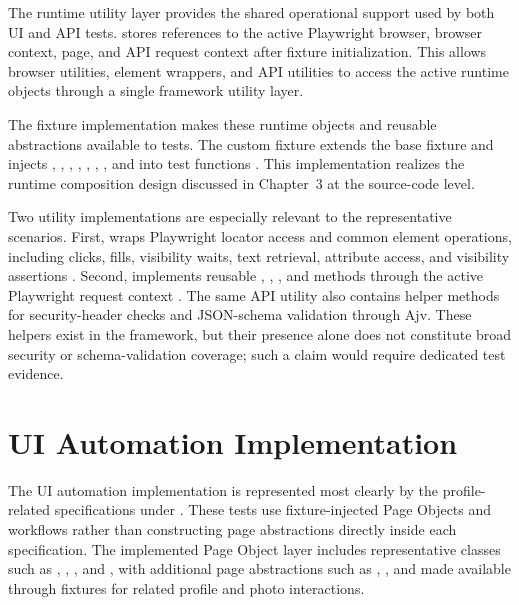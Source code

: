 The runtime utility layer provides the shared operational support used by both UI and API tests.  stores references to the active Playwright browser, browser context, page, and API request context after fixture initialization. This allows browser utilities, element wrappers, and API utilities to access the active runtime objects through a single framework utility layer.

The fixture implementation makes these runtime objects and reusable abstractions available to tests. The custom fixture extends the base fixture and injects , , , , , , , and  into test functions \autocite{playwright_docs_fixtures_2026}. This implementation realizes the runtime composition design discussed in Chapter~3 at the source-code level.

Two utility implementations are especially relevant to the representative scenarios. First,  wraps Playwright locator access and common element operations, including clicks, fills, visibility waits, text retrieval, attribute access, and visibility assertions \autocite{playwright_docs_locators_2026}. Second,  implements reusable , , , and  methods through the active Playwright request context \autocite{playwright_docs_apirequestcontext_2026}. The same API utility also contains helper methods for security-header checks and JSON-schema validation through Ajv. These helpers exist in the framework, but their presence alone does not constitute broad security or schema-validation coverage; such a claim would require dedicated test evidence.

\section{UI Automation Implementation}
\label{sec:ch4-ui-automation-implementation}

The UI automation implementation is represented most clearly by the profile-related specifications under . These tests use fixture-injected Page Objects and workflows rather than constructing page abstractions directly inside each specification. The implemented Page Object layer includes representative classes such as , , , and , with additional page abstractions such as , , and  made available through fixtures for related profile and photo interactions.

